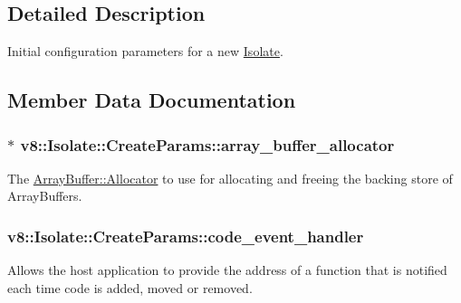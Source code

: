 \subsection{Detailed Description}
Initial configuration parameters for a new \hyperlink{classv8_1_1_isolate}{Isolate}. 

\subsection{Member Data Documentation}
\subsubsection[{\texorpdfstring{array\+\_\+buffer\+\_\+allocator}{array_buffer_allocator}}]{$\ast$ v8\+::\+Isolate\+::\+Create\+Params\+::array\+\_\+buffer\+\_\+allocator}\hypertarget{structv8_1_1_isolate_1_1_create_params_a7c663f70b64290392eeaf164f57585f9}{}\label{structv8_1_1_isolate_1_1_create_params_a7c663f70b64290392eeaf164f57585f9}
The \hyperlink{classv8_1_1_array_buffer_1_1_allocator}{Array\+Buffer\+::\+Allocator} to use for allocating and freeing the backing store of Array\+Buffers. 
\subsubsection[{\texorpdfstring{code\+\_\+event\+\_\+handler}{code_event_handler}}]{ v8\+::\+Isolate\+::\+Create\+Params\+::code\+\_\+event\+\_\+handler}\hypertarget{structv8_1_1_isolate_1_1_create_params_a783e3eba90ce6e2800bdd69197bbccdd}{}\label{structv8_1_1_isolate_1_1_create_params_a783e3eba90ce6e2800bdd69197bbccdd}
Allows the host application to provide the address of a function that is notified each time code is added, moved or removed. 
